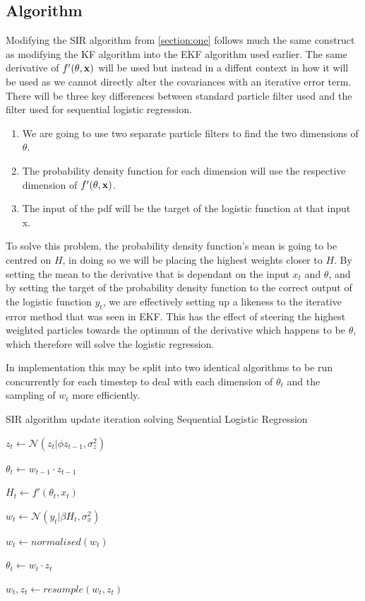 \documentclass[sigconf]{acmart}
\begin{document}
\subsection{Algorithm}
Modifying the SIR algorithm from \autoref{section:one} follows much the same construct as modifying the KF algorithm into the EKF algorithm used earlier.
The same derivative of $f'(\bf{\theta}, \bf{x})$ will be used but instead in a diffent context in how it will be used as we cannot directly alter the covariances with an iterative error term. 
\\
There will be three key differences between standard particle filter used and the filter used for sequential logistic regression.
\begin{enumerate}
  \item We are going to use two separate particle filters to find the two dimensions of $\theta$.
  \item The probability density function for each dimension will use the respective dimension of $f'(\bf{\theta}, \bf{x})$.
  \item The input of the pdf will be the target of the logistic function at that input x.
\end{enumerate}

To solve this problem, the probability density function's mean is going to be centred on $H$, in doing so we will be placing the highest weights closer to $H$. 
By setting the mean to the derivative that is dependant on the input $x_t$ and $\theta$, and by setting the target of the probability density function to the correct output of the logistic function $y_t$, we are effectively setting up a likeness to the iterative error method that was seen in EKF.
This has the effect of steering the highest weighted particles towards the optimum of the derivative which happens to be $\theta$, which therefore will solve the logistic regression.

In implementation this may be split into two identical algorithms to be run concurrently for each timestep to deal with each dimension of $\theta_t$ and the sampling of $w_t$ more efficiently.

\begin{algorithm2e}
  \caption{SIR algorithm update iteration solving Sequential Logistic Regression}
  \label{alg:SIR}
  \DontPrintSemicolon
  $z_t \gets \mathcal{N}(z_t | \phi z_{t-1}, \sigma^{2}_{z}) $\;

  $\theta_{t} \gets w_{t-1} \cdot z_{t-1}$\;

  $H_t \gets f'(\theta_{t}, x_t) $\;

  $w_t \gets \mathcal{N}(y_t | \beta H_t, \sigma^{2}_{x})$\;

  $w_t \gets normalised(w_t) $\;

  $\theta_{t} \gets w_{t} \cdot z_{t}$\;

  $w_t, z_t \gets resample(w_t, z_t)$\;

\end{algorithm2e}
\end{document}
